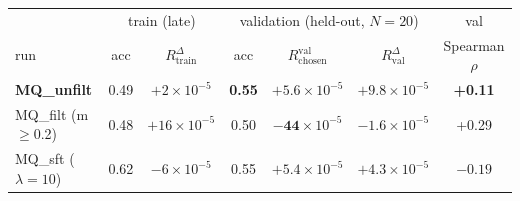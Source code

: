 \begin{tabular}{l|cc|ccc|c}
\toprule
 & \multicolumn{2}{c|}{train (late)} & \multicolumn{3}{c|}{validation (held-out, $N{=}20$)} & val \\
run & acc & $R^{\Delta}_{\text{train}}$ & acc & $R_{\text{chosen}}^{\text{val}}$ & $R^{\Delta}_{\text{val}}$ & Spearman $\rho$ \\
\midrule
\textbf{MQ\_unfilt}         & 0.49 & $+2{\times}10^{-5}$  & \textbf{0.55} & $+5.6{\times}10^{-5}$  & \textbf{$+9.8{\times}10^{-5}$} & \textbf{+0.11} \\
MQ\_filt (m$\geq$0.2)       & 0.48 & $+16{\times}10^{-5}$ & 0.50 & $\mathbf{-44}{\times}10^{-5}$ & $-1.6{\times}10^{-5}$         & +0.29 \\
MQ\_sft ($\lambda{=}10$)    & 0.62 & $-6{\times}10^{-5}$  & 0.55 & $+5.4{\times}10^{-5}$  & $+4.3{\times}10^{-5}$         & $\mathbf{-0.19}$ \\
\bottomrule
\end{tabular}
